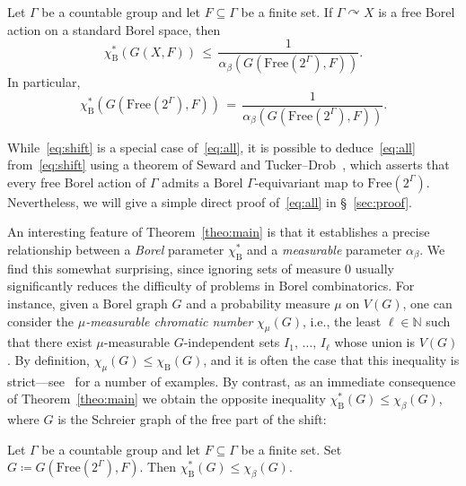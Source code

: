 \documentclass[AHL,Unicode,longabstracts,published]{cedram}
\newcommand{\0}{\varnothing}
\renewcommand{\leq}{\leqslant}
\newcommand{\defeq}{\coloneqq}
\newcommand{\N}{{\mathbb{N}}}
\newcommand{\Free}{\mathrm{Free}}
\newcommand{\rmB}{\mathrm{B}}
\begin{document}
\begin{theo}\label{theo:main}
Let $\Gamma$ be a countable group and let $F \subseteq \Gamma$ be a finite set. If $\Gamma \curvearrowright X$ is a free Borel action on a standard Borel space, then
\begin{equation}\label{eq:all}
\chi^\ast_\rmB(G(X,F)) \,\leq\, \frac{1}{\alpha_\beta\left(G\left(\Free\left(2^{\Gamma}\right), F\right)\right)}.
\end{equation}
In particular,
\begin{equation}\label{eq:shift}
\chi^\ast_\rmB\left(G\left(\Free\left(2^{\Gamma}\right), F\right)\right) \,=\, \frac{1}{\alpha_\beta\left(G\left(\Free\left(2^{\Gamma}\right), F\right)\right)}.
\end{equation}
\end{theo}

While~\eqref{eq:shift} is a special case of~\eqref{eq:all}, it is possible to deduce~\eqref{eq:all} from~\eqref{eq:shift} using a theorem of Seward and Tucker--Drob~\cite{STD}, which asserts that every free Borel action of $\Gamma$ admits a Borel $\Gamma$-equivariant map to $\Free(2^\Gamma)$. Nevertheless, we will give a simple direct proof of~\eqref{eq:all} in \S~\ref{sec:proof}.

An interesting feature of Theorem~\ref{theo:main} is that it establishes a precise relationship between a \emph{Borel} parameter $\chi^\ast_\rmB$ and a \emph{measurable} parameter $\alpha_\beta$. We find this somewhat surprising, since ignoring sets of measure $0$ usually significantly reduces the difficulty of problems in Borel combinatorics. For instance, given a Borel graph $G$ and a probability measure $\mu$ on $V(G)$, one can consider the \emph{$\mu$-measurable chromatic number} $\chi_\mu(G)$, i.e., the least $\ell \in \N$ such that there exist $\mu$-measurable $G$-independent sets $I_1,\, \ldots,\, I_\ell$ whose union is $V(G)$. By definition, $\chi_\mu(G) \leq \chi_\rmB(G)$, and it is often the case that this inequality is strict---see~\cite[\S~6]{KechrisMarks} for a number of examples. By contrast, as an immediate consequence of Theorem~\ref{theo:main} we obtain the opposite inequality $\chi_\rmB^\ast(G) \leq \chi_\beta(G)$, where $G$ is the Schreier graph of the free part of the shift:

\begin{coro}
Let $\Gamma$ be a countable group and let $F \subseteq \Gamma$ be a finite set. Set $G
\defeq G(\Free(2^{\Gamma}), F)$. Then $\chi^\ast_\rmB(G) \leq \chi_\beta(G)$.
\end{coro}
\end{document}
